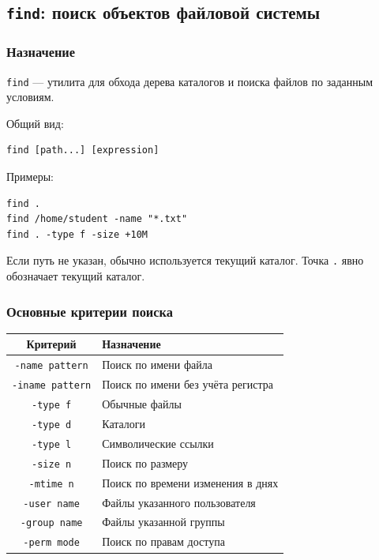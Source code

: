 \documentclass[12pt,a4paper]{article}
\begin{document}
\subsection{\texttt{find}: поиск объектов файловой системы}

\subsubsection{Назначение}

\texttt{find} --- утилита для обхода дерева каталогов и поиска файлов по заданным условиям.

Общий вид:

\begin{verbatim}
find [path...] [expression]
\end{verbatim}

Примеры:

\begin{verbatim}
find .
find /home/student -name "*.txt"
find . -type f -size +10M
\end{verbatim}

Если путь не указан, обычно используется текущий каталог. Точка \texttt{.} явно обозначает текущий каталог.

\subsubsection{Основные критерии поиска}

\begin{center}
\begin{tabular}{|c|p{10cm}|}
\hline
Критерий & Назначение \\
\hline
\texttt{-name pattern} & Поиск по имени файла \\
\hline
\texttt{-iname pattern} & Поиск по имени без учёта регистра \\
\hline
\texttt{-type f} & Обычные файлы \\
\hline
\texttt{-type d} & Каталоги \\
\hline
\texttt{-type l} & Символические ссылки \\
\hline
\texttt{-size n} & Поиск по размеру \\
\hline
\texttt{-mtime n} & Поиск по времени изменения в днях \\
\hline
\texttt{-user name} & Файлы указанного пользователя \\
\hline
\texttt{-group name} & Файлы указанной группы \\
\hline
\texttt{-perm mode} & Поиск по правам доступа \\
\hline
\end{tabular}
\end{center}
\end{document}
